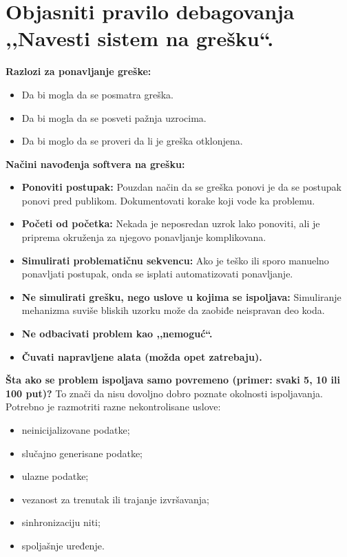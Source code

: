 \documentclass[a4paper]{article}
\begin{document}
\section{Objasniti pravilo debagovanja ,,Navesti sistem na grešku``.}
  \noindent \textbf{Razlozi za ponavljanje greške:}
  \begin{itemize}
    \item Da bi mogla da se posmatra greška.
    \item Da bi mogla da se posveti pažnja uzrocima.
    \item Da bi moglo da se proveri da li je greška otklonjena.
  \end{itemize}
  \textbf{Načini navođenja softvera na grešku:}
  \begin{itemize}
    \item \textbf{Ponoviti postupak:} Pouzdan način da se greška ponovi je da se postupak ponovi pred
          publikom. Dokumentovati korake koji vode ka problemu.
    \item \textbf{Početi od početka:} Nekada je neposredan uzrok lako ponoviti, ali je priprema 
          okruženja za njegovo ponavljanje komplikovana.
    \item \textbf{Simulirati problematičnu sekvencu:} Ako je teško ili sporo manuelno ponavljati postupak, onda
          se isplati automatizovati ponavljanje.
    \item \textbf{Ne simulirati grešku, nego uslove u kojima se ispoljava:} Simuliranje mehanizma 
          suviše bliskih uzorku može da zaobiđe neispravan deo koda.
    \item \textbf{Ne odbacivati problem kao ,,nemoguć``.}
    \item \textbf{Čuvati napravljene alata (možda opet zatrebaju).}
  \end{itemize}
  \textbf{Šta ako se problem ispoljava samo povremeno (primer: svaki 5, 10 ili 100 put)?} To znači
  da nisu dovoljno dobro poznate okolnosti ispoljavanja. Potrebno je razmotriti razne 
  nekontrolisane uslove:
  \begin{itemize}
    \item neinicijalizovane podatke;
    \item slučajno generisane podatke;
    \item ulazne podatke;
    \item vezanost za trenutak ili trajanje izvršavanja;
    \item sinhronizaciju niti;
    \item spoljašnje uređenje.
  \end{itemize} 
  
\end{document}
